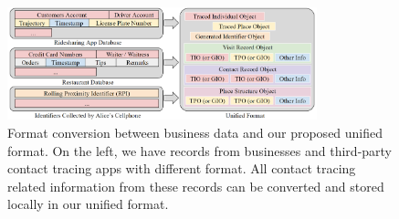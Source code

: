 \documentclass[11pt]{article}  %
\begin{document}
\begin{figure}
\centering
\includegraphics[width=0.8\textwidth, bb= 0 0 1839 669]{figs/uniform2.png}
\caption{Format conversion between business data and our proposed unified format. On the left, we have records from businesses and third-party contact tracing apps with different format. All contact tracing related information from these records can be converted and stored locally in our unified format.}
\label{busidata}
\end{figure}
\end{document}
